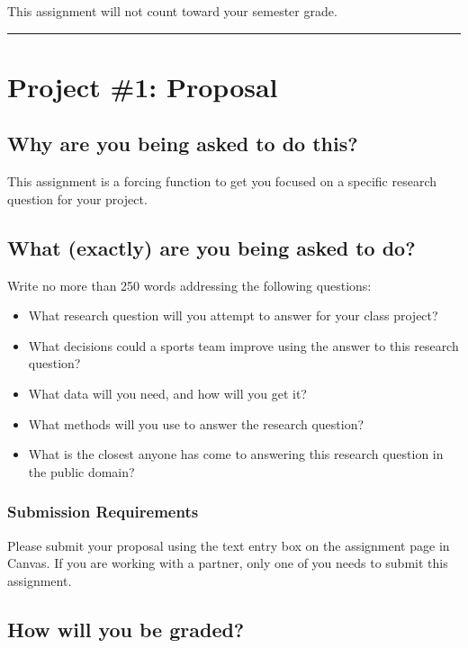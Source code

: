 \documentclass{article}
\begin{document}
      This assignment will not count toward your semester grade.\\

  \hrule
  \section*{\sc Project \#1: Proposal}

    \subsection*{\sc Why are you being asked to do this?}

      This assignment is a forcing function to get you focused on a specific research question for your project.

    \subsection*{\sc What (exactly) are you being asked to do?}

      Write no more than 250 words addressing the following questions:
      \begin{itemize}
        \item What research question will you attempt to answer for your class project?
        \item What decisions could a sports team improve using the answer to this research question?
        \item What data will you need, and how will you get it?
        \item What methods will you use to answer the research question?
        \item What is the closest anyone has come to answering this research question in the public domain?
      \end{itemize}

      \subsubsection*{\sc Submission Requirements}

        Please submit your proposal using the text entry box on the assignment page in Canvas. If you are working with a partner, only one of you needs to submit this assignment.

    \subsection*{\sc How will you be graded?}
\end{document}
